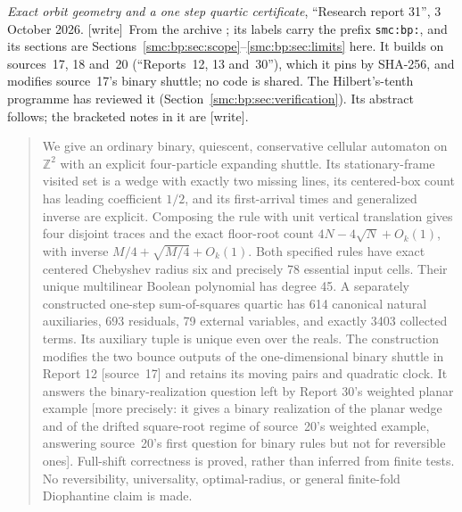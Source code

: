 \documentclass[11pt,letterpaper]{article}
\numberwithin{equation}{section}
\theoremstyle{definition}
\theoremstyle{remark}
\newcommand{\Z}{\mathbb Z}
\newcommand{\wtag}{\textup{[write]}}
\begin{document}
\bigskip
{}
\par
\noindent\emph{Exact orbit geometry and a one step quartic certificate}, ``Research report 31'', 3 October 2026. \wtag\ From the archive ; its labels carry the prefix \texttt{smc:bp:}, and its sections are Sections~\ref{smc:bp:sec:scope}--\ref{smc:bp:sec:limits} here. It builds on sources~17, 18 and~20 (``Reports~12, 13 and~30''), which it pins by SHA-256, and modifies source~17's binary shuttle; no code is shared. The Hilbert's-tenth programme has reviewed it (Section~\ref{smc:bp:sec:verification}). Its abstract follows; the bracketed notes in it are \wtag.
\begin{quote}\small
We give an ordinary binary, quiescent, conservative cellular automaton on $\Z^2$ with an explicit four-particle expanding shuttle. Its stationary-frame visited set is a wedge with exactly two missing lines, its centered-box count has leading coefficient $1/2$, and its first-arrival times and generalized inverse are explicit. Composing the rule with unit vertical translation gives four disjoint traces and the exact floor-root count $4N-4\sqrt N+O_k(1)$, with inverse $M/4+\sqrt{M/4}+O_k(1)$. Both specified rules have exact centered Chebyshev radius six and precisely 78 essential input cells. Their unique multilinear Boolean polynomial has degree 45. A separately constructed one-step sum-of-squares quartic has 614 canonical natural auxiliaries, 693 residuals, 79 external variables, and exactly 3403 collected terms. Its auxiliary tuple is unique even over the reals. The construction modifies the two bounce outputs of the one-dimensional binary shuttle in Report 12 [source~17] and retains its moving pairs and quadratic clock. It answers the binary-realization question left by Report 30's weighted planar example [more precisely: it gives a binary realization of the planar wedge and of the drifted square-root regime of source~20's weighted example, answering source~20's first question for binary rules but not for reversible ones]. Full-shift correctness is proved, rather than inferred from finite tests. No reversibility, universality, optimal-radius, or general finite-fold Diophantine claim is made.
\end{quote}
\end{document}
